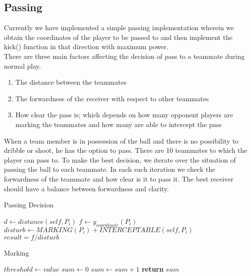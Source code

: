 \documentclass[conference,letterpaper]{IEEEtran}
\begin{document}
\subsection{\bf{Passing}}
Currently we have implemented a simple passing implementation wherein we obtain the coordinates of the player to be passed to and then implement the kick() function in that direction with maximum power.\\

There are three main factors affecting the decision of pass to a teammate during normal play.
\begin{enumerate}
\item The distance between the teammates
\item The forwardness of the receiver with respect to other teammates
\item How clear the pass is; which depends on how many opponent players are marking the teammates and how many are able to intercept the pass
\end{enumerate}

When a team member is in possession of the ball and there is no possibility to dribble or shoot, he has the option to pass. There are 10 teammates to which the player can pass to. To make the best decision, we iterate over the situation of passing the ball to each teammate. In each such iteration we check the forwardness of the teammate and how clear is it to pass it. The best receiver should have a balance between forwardness and clarity.

\begin{algorithm}[H]
\caption{Passing Decision}\label{pass}
\begin{algorithmic}[1]
\State $d \gets distance(self, P_{i})$
\State $f \gets y_{coordinate}(P_{i})$
\State $disturb \gets MARKING(P_{i}) + INTERCEPTABLE(self, P_{i})$
\State $result = f / disturb$
\EndFor
\EndProcedure
\end{algorithmic}
\end{algorithm}

\begin{algorithm}[H]
\caption{Marking}\label{mark}
\begin{algorithmic}[1]
\State $threshold \gets value$
\State $sum \gets 0$
\State $sum \gets sum + 1$
\EndIf
\EndFor
\State \textbf{return} $sum$
\EndProcedure
\end{algorithmic}
\end{algorithm}
\end{document}
